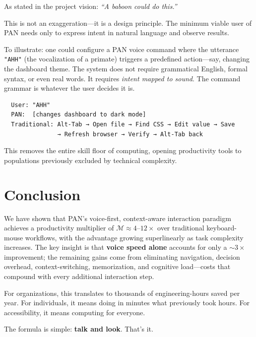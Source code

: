 \documentclass[11pt, a4paper]{article}
\begin{document}
As stated in the project vision: \emph{``A baboon could do this.''}

This is not an exaggeration---it is a design principle. The minimum viable user
of PAN needs only to express intent in natural language and observe results.

To illustrate: one could configure a PAN voice command where the utterance
\texttt{"AHH"} (the vocalization of a primate) triggers a predefined
action---say, changing the dashboard theme. The system does not require grammatical
English, formal syntax, or even real words. It requires \emph{intent mapped to
sound}. The command grammar is whatever the user decides it is.

\begin{verbatim}
  User: "AHH"
  PAN:  [changes dashboard to dark mode]
  Traditional: Alt-Tab → Open file → Find CSS → Edit value → Save
               → Refresh browser → Verify → Alt-Tab back
\end{verbatim}

This removes the entire skill floor of computing, opening productivity tools to
populations previously excluded by technical complexity.

\section{Conclusion}

We have shown that PAN's voice-first, context-aware interaction paradigm
achieves a productivity multiplier of $\mathcal{M} \approx 4\text{--}12\times$
over traditional keyboard-mouse workflows, with the advantage growing
superlinearly as task complexity increases. The key insight is that
\textbf{voice speed alone} accounts for only a $\sim\!3\times$ improvement;
the remaining gains come from eliminating navigation, decision overhead,
context-switching, memorization, and cognitive load---costs that compound
with every additional interaction step.

For organizations, this translates to thousands of engineering-hours saved per
year. For individuals, it means doing in minutes what previously took hours.
For accessibility, it means computing for everyone.

The formula is simple: \textbf{talk and look}. That's it.
\end{document}

